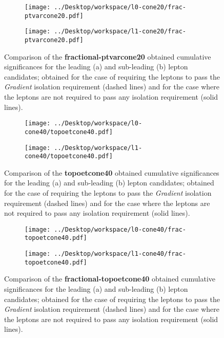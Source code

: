 \begin{figure}
\centering
\begin{subfigure}{.85\textwidth}
  \centering
  \texttt{[image: ../Desktop/workspace/l0-cone20/frac-ptvarcone20.pdf]}
  \caption{}
  \label{leading_frac-ptvarcone}
\end{subfigure}
\begin{subfigure}{.85\textwidth}
  \centering
  \texttt{[image: ../Desktop/workspace/l1-cone20/frac-ptvarcone20.pdf]}
  \caption{}
  \label{subleading_frac-ptvarcone}
\end{subfigure}
\caption{Comparison of the \textbf{fractional-ptvarcone20} obtained cumulative significances for the leading (a) and sub-leading (b) lepton candidates; obtained for the case of requiring the leptons to pass the \textit{Gradient} isolation requirement (dashed lines) and for the case where the leptons are not required to pass any isolation requirement (solid lines).}
\label{comp_frac-ptvarcone}
\end{figure}
\begin{figure}
\centering
\begin{subfigure}{.85\textwidth}
  \centering
  \texttt{[image: ../Desktop/workspace/l0-cone40/topoetcone40.pdf]}
  \caption{}
  \label{leading_topoetcone}
\end{subfigure}
\begin{subfigure}{.85\textwidth}
  \centering
  \texttt{[image: ../Desktop/workspace/l1-cone40/topoetcone40.pdf]}
  \caption{}
  \label{subleading_topoetcone}
\end{subfigure}
\caption{Comparison of the \textbf{topoetcone40} obtained cumulative significances for the leading (a) and sub-leading (b) lepton candidates; obtained for the case of requiring the leptons to pass the \textit{Gradient} isolation requirement (dashed lines) and for the case where the leptons are not required to pass any isolation requirement (solid lines).}
\label{comp_topoetcone}
\end{figure}
\begin{figure}
\centering
\begin{subfigure}{.85\textwidth}
  \centering
  \texttt{[image: ../Desktop/workspace/l0-cone40/frac-topoetcone40.pdf]}
  \caption{}
  \label{leading_frac-topoetcone}
\end{subfigure}
\begin{subfigure}{.85\textwidth}
  \centering
  \texttt{[image: ../Desktop/workspace/l1-cone40/frac-topoetcone40.pdf]}
  \caption{}
  \label{subleading_frac-topoetcone}
\end{subfigure}
\caption{Comparison of the \textbf{fractional-topoetcone40} obtained cumulative significances for the leading (a) and sub-leading (b) lepton candidates; obtained for the case of requiring the leptons to pass the \textit{Gradient} isolation requirement (dashed lines) and for the case where the leptons are not required to pass any isolation requirement (solid lines).}
\label{comp_frac-topoetcone40}
\end{figure}
